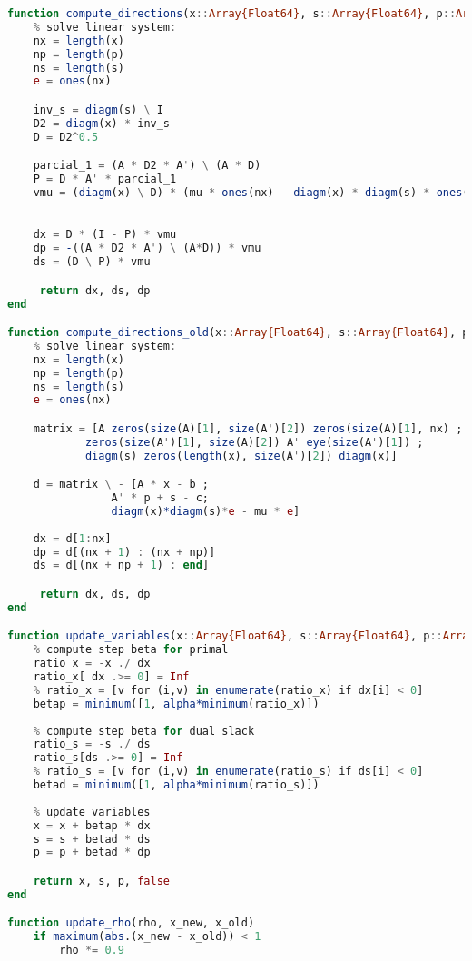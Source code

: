 \documentclass[a4paper]{IEEEtran}
\begin{document}
\begin{lstlisting}[language=Julia,numbers=none]
function compute_directions(x::Array{Float64}, s::Array{Float64}, p::Array{Float64}, mu::Float64,  A::Array{Float64}, b::Array{Float64}, c::Array{Float64})
    % solve linear system:
    nx = length(x)
    np = length(p)
    ns = length(s)
    e = ones(nx)

    inv_s = diagm(s) \ I 
    D2 = diagm(x) * inv_s
    D = D2^0.5

    parcial_1 = (A * D2 * A') \ (A * D)
    P = D * A' * parcial_1
    vmu = (diagm(x) \ D) * (mu * ones(nx) - diagm(x) * diagm(s) * ones(nx))
    

    dx = D * (I - P) * vmu
    dp = -((A * D2 * A') \ (A*D)) * vmu
    ds = (D \ P) * vmu

     return dx, ds, dp
end

function compute_directions_old(x::Array{Float64}, s::Array{Float64}, p::Array{Float64}, mu::Float64,  A::Array{Float64}, b::Array{Float64}, c::Array{Float64})
    % solve linear system:
    nx = length(x)
    np = length(p)
    ns = length(s)
    e = ones(nx)

    matrix = [A zeros(size(A)[1], size(A')[2]) zeros(size(A)[1], nx) ;
            zeros(size(A')[1], size(A)[2]) A' eye(size(A')[1]) ;
            diagm(s) zeros(length(x), size(A')[2]) diagm(x)]

    d = matrix \ - [A * x - b ;
                A' * p + s - c;
                diagm(x)*diagm(s)*e - mu * e]
    
    dx = d[1:nx]
    dp = d[(nx + 1) : (nx + np)]
    ds = d[(nx + np + 1) : end]

     return dx, ds, dp
end

function update_variables(x::Array{Float64}, s::Array{Float64}, p::Array{Float64}, dx::Array{Float64}, ds::Array{Float64}, dp::Array{Float64}, alpha::Float64)
    % compute step beta for primal
    ratio_x = -x ./ dx
    ratio_x[ dx .>= 0] = Inf
    % ratio_x = [v for (i,v) in enumerate(ratio_x) if dx[i] < 0]
    betap = minimum([1, alpha*minimum(ratio_x)]) 
    
    % compute step beta for dual slack
    ratio_s = -s ./ ds
    ratio_s[ds .>= 0] = Inf
    % ratio_s = [v for (i,v) in enumerate(ratio_s) if ds[i] < 0]
    betad = minimum([1, alpha*minimum(ratio_s)]) 
    
    % update variables
    x = x + betap * dx
    s = s + betad * ds
    p = p + betad * dp

    return x, s, p, false
end

function update_rho(rho, x_new, x_old)
    if maximum(abs.(x_new - x_old)) < 1
        rho *= 0.9


\end{lstlisting}
\end{document}
